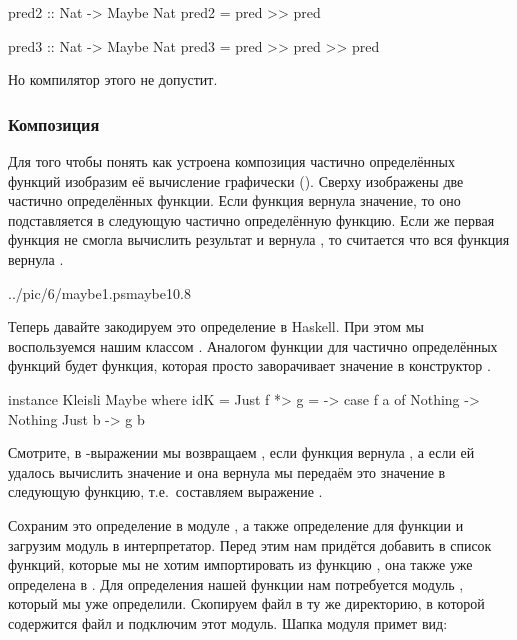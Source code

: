 \begin{code}
pred2 :: Nat -> Maybe Nat
pred2 = pred >> pred

pred3 :: Nat -> Maybe Nat
pred3 = pred >> pred >> pred
\end{code}

Но компилятор этого не допустит.  

\subsubsection{Композиция}

Для того чтобы понять как устроена композиция частично определённых
функций изобразим её вычисление графически (). 
Сверху изображены две частично определённых функции. 
Если функция  вернула значение, то оно подставляется 
в следующую частично определённую функцию. Если же первая функция
не смогла вычислить результат и вернула , то считается
что вся функция  вернула . 

%
{../pic/6/maybe1.ps}{maybe1}{0.8}


Теперь давайте закодируем это определение в Haskell. При этом 
мы воспользуемся нашим классом . Аналогом
функции  для частично определённых функций будет функция,
которая просто заворачивает значение в конструктор .

\begin{code}
instance Kleisli Maybe where
    idK    = Just
    f *> g = \a -> case f a of
                        Nothing -> Nothing
                        Just b  -> g b
\end{code}

Смотрите, в -выражении мы возвращаем ,
если функция  вернула , а если ей удалось
вычислить значение и она вернула  мы передаём
это значение в следующую функцию, т.е.~составляем выражение \mbox{}.

Сохраним это определение в модуле , а также определение
для функции  и загрузим модуль в интерпретатор.
Перед этим нам придётся добавить в список функций, 
которые мы не хотим импортировать из 
функцию , она также уже определена в .
Для определения нашей функции нам потребуется модуль ,
который мы уже определили. Скопируем файл  в 
ту же директорию, в которой содержится файл  
и подключим этот модуль. Шапка модуля примет вид:

